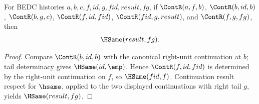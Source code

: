 \begin{theorem}
\label{thm:category-cont-middle-identity-tail-result}
For BEDC histories $a,b,c,f,id,g,fid,result,fg$, if
$\ContR(a,f,b)$, $\ContR(b,id,b)$, $\ContR(b,g,c)$,
$\ContR(f,id,fid)$, $\ContR(fid,g,result)$, and $\ContR(f,g,fg)$, then
$$
\HSame(result,fg).
$$
\end{theorem}
\begin{proof}
Compare $\ContR(b,id,b)$ with the canonical right-unit continuation at $b$;
tail determinacy gives $\HSame(id,\emp)$. Hence $\ContR(f,id,fid)$ is
determined by the right-unit continuation on $f$, so $\HSame(fid,f)$.
Continuation result respect for $\hsame$, applied to the two displayed
continuations with right tail $g$, yields $\HSame(result,fg)$.
\end{proof}

